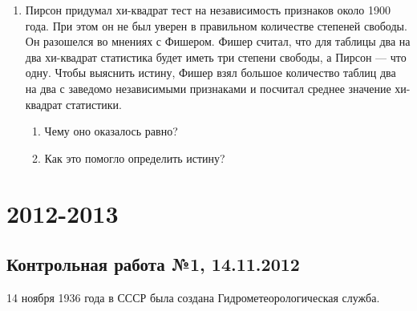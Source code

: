 \documentclass[pdftex,12pt,a4paper]{article}
\begin{document}
\begin{enumerate}
\item Пирсон придумал хи-квадрат тест на независимость признаков около 1900 года. При этом он не был уверен в правильном количестве степеней свободы. Он разошелся во мнениях с Фишером. Фишер считал, что для таблицы два на два хи-квадрат статистика будет иметь три степени свободы, а Пирсон --- что одну. Чтобы выяснить истину, Фишер взял большое количество таблиц два на два с заведомо независимыми признаками и посчитал среднее значение хи-квадрат статистики. 
\begin{enumerate}
\item Чему оно оказалось равно?
\item Как это помогло определить истину?
\end{enumerate}


\end{enumerate}




\section{2012-2013}

\subsection{Контрольная работа №1, 14.11.2012}




\vspace{20pt}
14 ноября 1936 года в СССР была создана Гидрометеорологическая служба.
\vspace{20pt}
\end{document}
